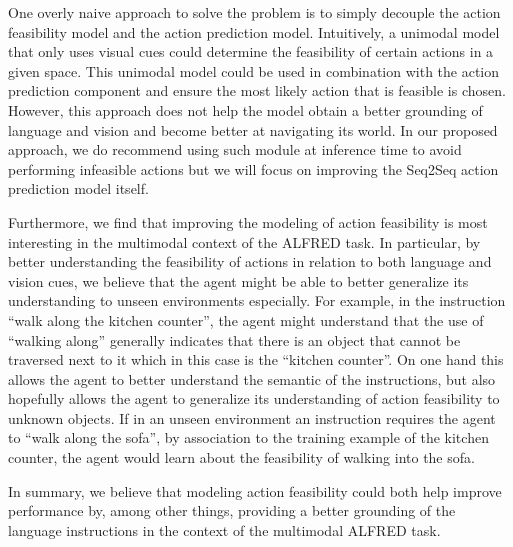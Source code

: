 \documentclass[11pt,a4paper]{article}
\begin{document}
One overly naive approach to solve the problem is to simply decouple the action feasibility model and the action prediction model. Intuitively, a unimodal model that only uses visual cues could determine the feasibility of certain actions in a given space. This unimodal model could be used in combination with the action prediction component and ensure the most likely action that is feasible is chosen. However, this approach does not help the model obtain a better grounding of language and vision and become better at navigating its world. In our proposed approach, we do recommend using such module at inference time to avoid performing infeasible actions but we will focus on improving the Seq2Seq action prediction model itself.

Furthermore, we find that improving the modeling of action feasibility is most interesting in the multimodal context of the ALFRED task. In particular, by better understanding the feasibility of actions in relation to both language and vision cues, we believe that the agent might be able to better generalize its understanding to unseen environments especially. For example, in the instruction ``walk along the kitchen counter'', the agent might understand that the use of ``walking along'' generally indicates that there is an object that cannot be traversed next to it which in this case is the ``kitchen counter''. On one hand this allows the agent to better understand the semantic of the instructions, but also hopefully allows the agent to generalize its understanding of action feasibility to unknown objects. If in an unseen environment an instruction requires the agent to ``walk along the sofa'', by association to the training example of the kitchen counter, the agent would learn about the feasibility of walking into the sofa.

In summary, we believe that modeling action feasibility could both help improve performance by, among other things, providing a better grounding of the language instructions in the context of the multimodal ALFRED task.
\end{document}
